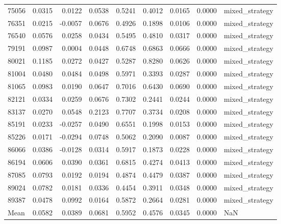 \begin{tabular}{lrrrrrrrl}
75056 & 0.0315 & 0.0122 & 0.0538 & 0.5241 & 0.4012 & 0.0165 & 0.0000 & mixed_strategy \\
76351 & 0.0215 & -0.0057 & 0.0676 & 0.4926 & 0.1898 & 0.0106 & 0.0000 & mixed_strategy \\
76540 & 0.0576 & 0.0258 & 0.0434 & 0.5495 & 0.4810 & 0.0317 & 0.0000 & mixed_strategy \\
79191 & 0.0987 & 0.0004 & 0.0448 & 0.6748 & 0.6863 & 0.0666 & 0.0000 & mixed_strategy \\
80021 & 0.1185 & 0.0272 & 0.0427 & 0.5287 & 0.8280 & 0.0626 & 0.0000 & mixed_strategy \\
81004 & 0.0480 & 0.0484 & 0.0498 & 0.5971 & 0.3393 & 0.0287 & 0.0000 & mixed_strategy \\
81065 & 0.0983 & 0.0190 & 0.0647 & 0.7016 & 0.6430 & 0.0690 & 0.0000 & mixed_strategy \\
82121 & 0.0334 & 0.0259 & 0.0676 & 0.7302 & 0.2441 & 0.0244 & 0.0000 & mixed_strategy \\
83137 & 0.0270 & 0.0548 & 0.2123 & 0.7707 & 0.3734 & 0.0208 & 0.0000 & mixed_strategy \\
85191 & 0.0233 & -0.0257 & 0.0490 & 0.6551 & 0.1998 & 0.0153 & 0.0000 & mixed_strategy \\
85226 & 0.0171 & -0.0294 & 0.0748 & 0.5062 & 0.2090 & 0.0087 & 0.0000 & mixed_strategy \\
86066 & 0.0386 & -0.0128 & 0.0314 & 0.5917 & 0.1873 & 0.0228 & 0.0000 & mixed_strategy \\
86194 & 0.0606 & 0.0390 & 0.0361 & 0.6815 & 0.4274 & 0.0413 & 0.0000 & mixed_strategy \\
87085 & 0.0793 & 0.0192 & 0.0194 & 0.4874 & 0.4479 & 0.0387 & 0.0000 & mixed_strategy \\
89024 & 0.0782 & 0.0181 & 0.0336 & 0.4454 & 0.3911 & 0.0348 & 0.0000 & mixed_strategy \\
89387 & 0.0478 & 0.0992 & 0.0164 & 0.5872 & 0.2664 & 0.0281 & 0.0000 & mixed_strategy \\
Mean & 0.0582 & 0.0389 & 0.0681 & 0.5952 & 0.4576 & 0.0345 & 0.0000 & NaN \\
\bottomrule
\end{tabular}
